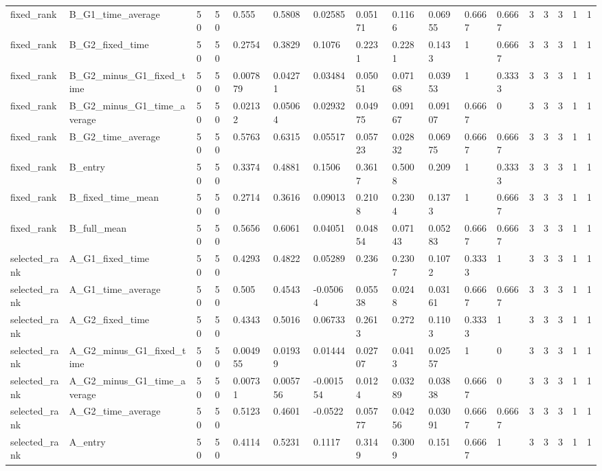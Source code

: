 \begin{longtable}{lllllllllllllllll}
fixed\_rank & B\_G1\_time\_average & 50 & 50 & 0.555 & 0.5808 & 0.02585 & 0.05171 & 0.1166 & 0.06955 & 0.6667 & 0.6667 & 3 & 3 & 3 & 1 & 1 \\
fixed\_rank & B\_G2\_fixed\_time & 50 & 50 & 0.2754 & 0.3829 & 0.1076 & 0.2231 & 0.2281 & 0.1433 & 1 & 0.6667 & 3 & 3 & 3 & 1 & 1 \\
fixed\_rank & B\_G2\_minus\_G1\_fixed\_time & 50 & 50 & 0.007879 & 0.04271 & 0.03484 & 0.05051 & 0.07168 & 0.03953 & 1 & 0.3333 & 3 & 3 & 3 & 1 & 1 \\
fixed\_rank & B\_G2\_minus\_G1\_time\_average & 50 & 50 & 0.02132 & 0.05064 & 0.02932 & 0.04975 & 0.09167 & 0.09107 & 0.6667 & 0 & 3 & 3 & 3 & 1 & 1 \\
fixed\_rank & B\_G2\_time\_average & 50 & 50 & 0.5763 & 0.6315 & 0.05517 & 0.05723 & 0.02832 & 0.06975 & 0.6667 & 0.6667 & 3 & 3 & 3 & 1 & 1 \\
fixed\_rank & B\_entry & 50 & 50 & 0.3374 & 0.4881 & 0.1506 & 0.3617 & 0.5008 & 0.209 & 1 & 0.3333 & 3 & 3 & 3 & 1 & 1 \\
fixed\_rank & B\_fixed\_time\_mean & 50 & 50 & 0.2714 & 0.3616 & 0.09013 & 0.2108 & 0.2304 & 0.1373 & 1 & 0.6667 & 3 & 3 & 3 & 1 & 1 \\
fixed\_rank & B\_full\_mean & 50 & 50 & 0.5656 & 0.6061 & 0.04051 & 0.04854 & 0.07143 & 0.05283 & 0.6667 & 0.6667 & 3 & 3 & 3 & 1 & 1 \\
selected\_rank & A\_G1\_fixed\_time & 50 & 50 & 0.4293 & 0.4822 & 0.05289 & 0.236 & 0.2307 & 0.1072 & 0.3333 & 1 & 3 & 3 & 3 & 1 & 1 \\
selected\_rank & A\_G1\_time\_average & 50 & 50 & 0.505 & 0.4543 & -0.05064 & 0.05538 & 0.0248 & 0.03161 & 0.6667 & 0.6667 & 3 & 3 & 3 & 1 & 1 \\
selected\_rank & A\_G2\_fixed\_time & 50 & 50 & 0.4343 & 0.5016 & 0.06733 & 0.2613 & 0.272 & 0.1103 & 0.3333 & 1 & 3 & 3 & 3 & 1 & 1 \\
selected\_rank & A\_G2\_minus\_G1\_fixed\_time & 50 & 50 & 0.004955 & 0.01939 & 0.01444 & 0.02707 & 0.0413 & 0.02557 & 1 & 0 & 3 & 3 & 3 & 1 & 1 \\
selected\_rank & A\_G2\_minus\_G1\_time\_average & 50 & 50 & 0.00731 & 0.005756 & -0.001554 & 0.0124 & 0.03289 & 0.03838 & 0.6667 & 0 & 3 & 3 & 3 & 1 & 1 \\
selected\_rank & A\_G2\_time\_average & 50 & 50 & 0.5123 & 0.4601 & -0.0522 & 0.05777 & 0.04256 & 0.03091 & 0.6667 & 0.6667 & 3 & 3 & 3 & 1 & 1 \\
selected\_rank & A\_entry & 50 & 50 & 0.4114 & 0.5231 & 0.1117 & 0.3149 & 0.3009 & 0.151 & 0.6667 & 1 & 3 & 3 & 3 & 1 & 1 \\

\end{longtable}
